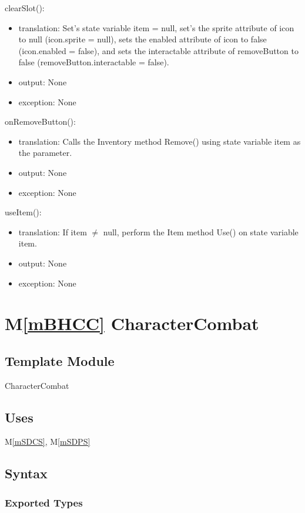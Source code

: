 \documentclass[12pt]{article}
\newcommand{\mref}[1]{M\ref{#1}}
\begin{document}
\noindent clearSlot():
\begin{itemize}
\item translation: Set's state variable item = null, set's the sprite attribute of icon to null (icon.sprite = null), sets the enabled attribute of icon to false (icon.enabled = false), and sets the interactable attribute of removeButton to false (removeButton.interactable = false).
\item output: None
\item exception: None
\end{itemize}

\noindent onRemoveButton():
\begin{itemize}
\item translation: Calls the Inventory method Remove() using state variable item as the parameter.
\item output: None
\item exception: None
\end{itemize}

\noindent useItem():
\begin{itemize}
\item translation: If item $\neq$ null, perform the Item method Use() on state variable item.
\item output: None
\item exception: None
\end{itemize}

\newpage

\section* {\mref{mBHCC} CharacterCombat}

\subsection*{Template Module}

CharacterCombat

\subsection* {Uses}

\mref{mSDCS}, {\color{magenta} \mref{mSDPS}}

\subsection* {Syntax}

\subsubsection* {Exported Types}
\end{document}
